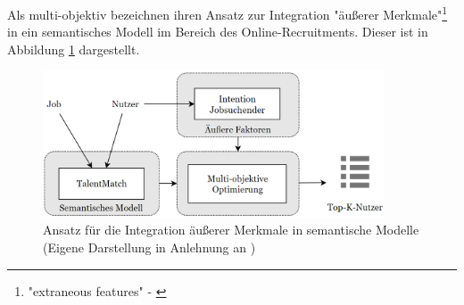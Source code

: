 
Als multi-objektiv bezeichnen \textcite[S. 12]{rodriguez:inproceedings} ihren Ansatz zur Integration "äußerer Merkmale"\footnote{"extraneous features" - \textcite[S. 12]{rodriguez:inproceedings}} in ein semantisches Modell im Bereich des Online-Recruitments. 
Dieser ist in Abbildung \ref{fig:relatedwork:abb1} dargestellt.

\begin{figure}[H]
    \centering
	\includegraphics[width=0.9\textwidth]{gfx/talentMatch.png}
	\caption[Ansatz für die Integration äußerer Merkmale in semantische Modelle]{Ansatz für die Integration äußerer Merkmale in semantische Modelle\\
    (Eigene Darstellung in Anlehnung an \cite[S. 12]{rodriguez:inproceedings})}
	\label{fig:relatedwork:abb1}
\end{figure}

